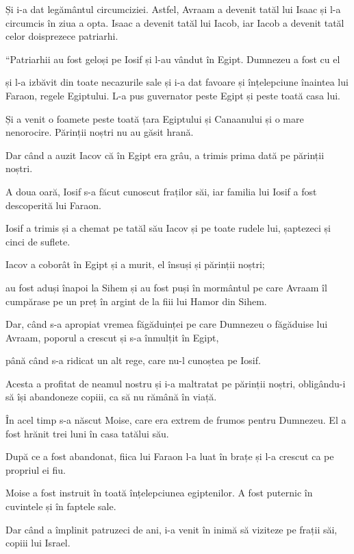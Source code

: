 {Și i-a dat legământul circumciziei. Astfel, Avraam a devenit tatăl lui Isaac și l-a circumcis în ziua a opta. Isaac a devenit tatăl lui Iacob, iar Iacob a devenit tatăl celor doisprezece patriarhi.


\par }{\PP {}“Patriarhii au fost geloși pe Iosif și l-au vândut în Egipt. Dumnezeu a fost cu el

și l-a izbăvit din toate necazurile sale și i-a dat favoare și înțelepciune înaintea lui Faraon, regele Egiptului. L-a pus guvernator peste Egipt și peste toată casa lui.

Și a venit o foamete peste toată țara Egiptului și Canaanului și o mare nenorocire. Părinții noștri nu au găsit hrană.

Dar când a auzit Iacov că în Egipt era grâu, a trimis prima dată pe părinții noștri.

A doua oară, Iosif s-a făcut cunoscut fraților săi, iar familia lui Iosif a fost descoperită lui Faraon.

Iosif a trimis și a chemat pe tatăl său Iacov și pe toate rudele lui, șaptezeci și cinci de suflete.

Iacov a coborât în Egipt și a murit, el însuși și părinții noștri;

au fost aduși înapoi la Sihem și au fost puși în mormântul pe care Avraam îl cumpărase pe un preț în argint de la fiii lui Hamor din Sihem.


\par }{\PP {}Dar, când s-a apropiat vremea făgăduinței pe care Dumnezeu o făgăduise lui Avraam, poporul a crescut și s-a înmulțit în Egipt,

până când s-a ridicat un alt rege, care nu-l cunoștea pe Iosif.

Acesta a profitat de neamul nostru și i-a maltratat pe părinții noștri, obligându-i să își abandoneze copiii, ca să nu rămână în viață.

În acel timp s-a născut Moise, care era extrem de frumos pentru Dumnezeu. El a fost hrănit trei luni în casa tatălui său.

După ce a fost abandonat, fiica lui Faraon l-a luat în brațe și l-a crescut ca pe propriul ei fiu.

Moise a fost instruit în toată înțelepciunea egiptenilor. A fost puternic în cuvintele și în faptele sale.

Dar când a împlinit patruzeci de ani, i-a venit în inimă să viziteze pe frații săi, copiii lui Israel.

}
